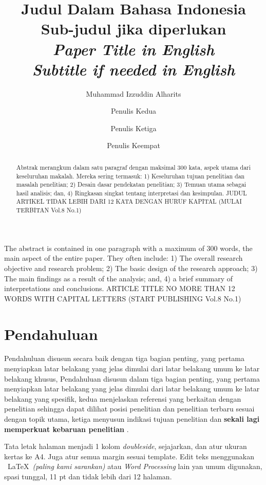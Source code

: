 \documentclass[
 manuscript=article,  %
  layout=publish, 
  year=2024, 
  month= Februari, %
  volume=8,
  number=1 
]{JIKO}
\title{%
	Judul Dalam Bahasa Indonesia\\
	{\large Sub-judul jika diperlukan}\\[1ex]
	\itshape Paper Title in English\\
	{\large Subtitle if needed in English}%
}
\author{Muhammad Izzuddin Alharits}
\affiliation{Teknik Komputer, Fakultas Teknologi Informasi, Universitas Teknologi Digital Indonesia, Yogyakarta, Indonesia}
\author{Penulis Kedua}
\affiliation{Departmen, Fakultas, Kampus-2, Kota, Negara}
\author{Penulis Ketiga}
\affiliation{Departmen, Fakultas, Kampus-1, Kota, Negara}
\author{Penulis Keempat}
\affiliation{Departmen, Fakultas, Kampus-4, Kota, Negara}
\begin{document}

 
\begin{abstract}
	 Abstrak merangkum dalam satu paragraf dengan maksimal 300 kata, aspek utama dari keseluruhan makalah. Mereka sering termasuk: 1) Keseluruhan tujuan penelitian dan masalah penelitian; 2) Desain dasar pendekatan penelitian; 3) Temuan utama sebagai hasil analisis; dan, 4) Ringkasan singkat tentang interpretasi dan kesimpulan. JUDUL ARTIKEL TIDAK LEBIH DARI 12 KATA DENGAN HURUF KAPITAL (MULAI TERBITAN Vol.8 No.1)
\end{abstract}

\begin{abstracting}
The abstract is contained in one paragraph with a maximum of 300 words, the main aspect of the entire paper. They often include: 1) The overall research objective and research problem; 2) The basic design of the research approach; 3) The main findings as a result of the analysis; and, 4) a brief summary of interpretations and conclusions. ARTICLE TITLE NO MORE THAN 12 WORDS WITH CAPITAL LETTERS (START PUBLISHING Vol.8 No.1)
\end{abstracting}

\section{Pendahuluan}
Pendahuluan disusun secara baik dengan tiga bagian penting, yang pertama menyiapkan latar belakang yang jelas dimulai dari latar belakang umum ke latar belakang khusus, Pendahuluan disusun dalam tiga bagian penting, yang pertama menyiapkan latar belakang yang jelas dimulai dari latar belakang umum ke latar belakang yang spesifik, kedua menjelaskan referensi yang berkaitan dengan penelitian sehingga dapat dilihat posisi penelitian dan penelitian terbaru sesuai dengan topik utama, ketiga menyusun indikasi tujuan penelitian dan \textbf{sekali lagi memperkuat kebaruan penelitian} \cite{Barden2000}\cite{Erwi2015}\cite{George1999}.

Tata letak halaman menjadi 1 kolom \textit{doubleside}, sejajarkan, dan atur ukuran kertas ke A4. Juga atur semua margin
sesuai template. Edit teks menggunakan \ \LaTeX \ \textit{(paling kami sarankan)} atau \textit{Word Processing} lain yan umum digunakan, spasi tunggal, 11 pt dan
 tidak lebih dari 12 halaman. 
\end{document}
